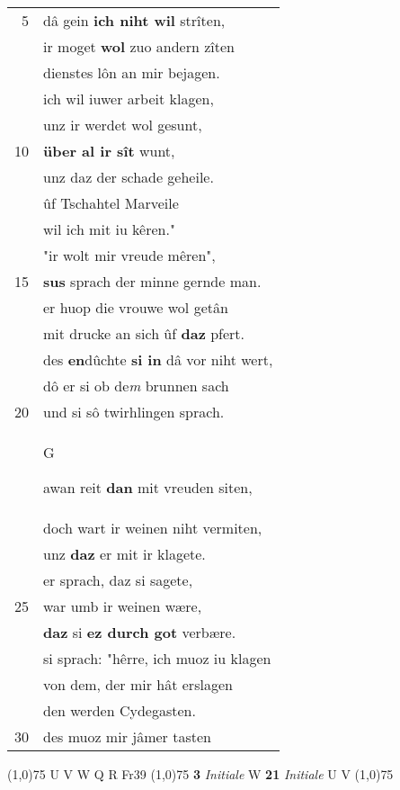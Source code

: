 \documentclass[8pt,a4paper,notitlepage]{article}
\begin{document}
\begin{table}[ht]
\begin{minipage}[t]{0.5\linewidth}
\begin{tabular}{rl}
5 & dâ gein \textbf{ich niht wil} strîten,\\ 
 & ir moget \textbf{wol} zuo andern zîten\\ 
 & dienstes lôn an mir bejagen.\\ 
 & ich wil iuwer arbeit klagen,\\ 
 & unz ir werdet wol gesunt,\\ 
10 & \textbf{über al ir sît} wunt,\\ 
 & unz daz der schade geheile.\\ 
 & ûf Tschahtel Marveile\\ 
 & wil ich mit iu kêren."\\ 
 & "ir wolt mir vreude mêren",\\ 
15 & \textbf{sus} sprach der minne gernde man.\\ 
 & er huop die vrouwe wol getân\\ 
 & mit drucke an sich ûf \textbf{daz} pfert.\\ 
 & des \textbf{en}dûchte \textbf{si in} dâ vor niht wert,\\ 
 & dô er si ob de\textit{m} brunnen sach\\ 
20 & und si sô twirhlingen sprach.\\ 
 & \begin{large}G\end{large}awan reit \textbf{dan} mit vreuden siten,\\ 
 & doch wart ir weinen niht vermiten,\\ 
 & unz \textbf{daz} er mit ir klagete.\\ 
 & er sprach, daz si sagete,\\ 
25 & war umb ir weinen wære,\\ 
 & \textbf{daz} si \textbf{ez durch got} verbære.\\ 
 & si sprach: "hêrre, ich muoz iu klagen\\ 
 & von dem, der mir hât erslagen\\ 
 & den werden Cydegasten.\\ 
30 & des muoz mir jâmer tasten\\ 
\end{tabular}
\scriptsize
\line(1,0){75} \newline
U V W Q R Fr39 \newline
\line(1,0){75} \newline
\textbf{3} \textit{Initiale} W  \textbf{21} \textit{Initiale} U V  \newline
\line(1,0){75} \newline

\end{minipage}
\end{table}
\end{document}
